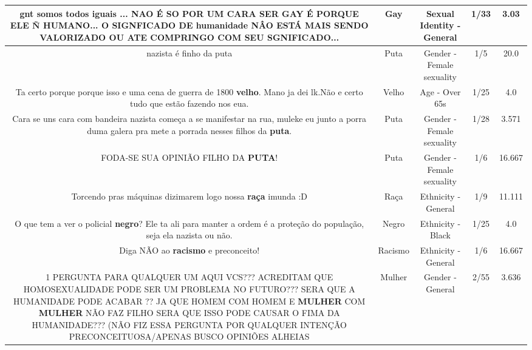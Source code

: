 \documentclass[11pt]{article}
\newlength\mylength
\begin{document}
\begin{center}
\begin{longtable}{|C{.65\mylength}|C{.30\mylength}|C{.12\mylength}|C{.12\mylength}|C{.12\mylength}|}
  \small gnt somos todos  iguais ... NAO É SO POR UM CARA SER \textbf{GAY} É PORQUE ELE Ñ HUMANO... O SIGNFICADO DE  humanidade   NÂO ESTÁ MAIS SENDO VALORIZADO OU ATE COMPRINGO COM SEU SGNIFICADO...\normalsize   & Gay & Sexual Identity - General & 1/33 & 3.03 \\  \hline
  \small nazista é finho da puta\normalsize   & Puta & Gender - Female sexuality & 1/5 & 20.0 \\  \hline
  \small Ta certo porque porque isso e uma cena de guerra de 1800 \textbf{velho}. Mano ja dei lk.Não e certo tudo que estão fazendo nos eua.\normalsize   & Velho & Age - Over 65s & 1/25 & 4.0 \\  \hline
  \small Cara se uns cara com bandeira nazista começa a se manifestar na rua, muleke eu junto a porra duma galera pra mete a porrada nesses filhos da \textbf{puta}.\normalsize   & Puta & Gender - Female sexuality & 1/28 & 3.571 \\  \hline
  \small FODA-SE SUA OPINIÃO FILHO DA \textbf{PUTA}!\normalsize   & Puta & Gender - Female sexuality & 1/6 & 16.667 \\  \hline
  \small Torcendo pras máquinas dizimarem logo nossa \textbf{raça} imunda :D\normalsize   & Raça & Ethnicity - General & 1/9 & 11.111 \\  \hline
  \small O que tem a ver o policial \textbf{negro}? Ele ta ali para manter a ordem é a proteção do população, seja ela nazista ou não.\normalsize   & Negro & Ethnicity - Black & 1/25 & 4.0 \\  \hline
  \small Diga NÃO ao \textbf{racismo} e preconceito!\normalsize   & Racismo & Ethnicity - General & 1/6 & 16.667 \\  \hline
  \small 1 PERGUNTA PARA QUALQUER UM AQUI   VCS??? ACREDITAM QUE HOMOSEXUALIDADE PODE SER UM PROBLEMA NO FUTURO??? SERA QUE A HUMANIDADE PODE ACABAR ?? JA QUE HOMEM COM HOMEM E \textbf{MULHER} COM \textbf{MULHER} NÃO FAZ FILHO SERA QUE ISSO PODE CAUSAR O FIMA DA HUMANIDADE??? (NÃO FIZ ESSA PERGUNTA POR QUALQUER INTENÇÃO PRECONCEITUOSA/APENAS  BUSCO OPINIÕES ALHEIAS\normalsize   & Mulher & Gender - General & 2/55 & 3.636 \\  \hline

\end{longtable}
\end{center}
\end{document}
